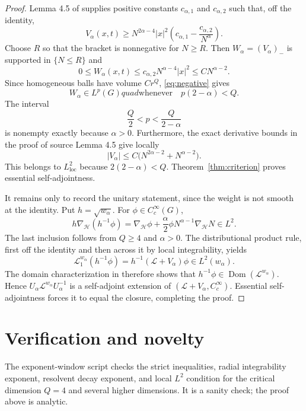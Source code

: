 \documentclass[11pt]{article}
\newcommand{\Lcal}{\mathcal L}
\newcommand{\Dom}{\operatorname{Dom}}
\begin{document}
\begin{proof}
Lemma 4.5 of \cite{BC} supplies positive constants $c_{\alpha,1}$ and
$c_{\alpha,2}$ such that, off the identity,
\begin{equation}\label{eq:source-lower}
 V_\alpha(x,t)\geq
 N^{2\alpha-4}|x|^2
 \left(c_{\alpha,1}-\frac{c_{\alpha,2}}{N^\alpha}\right).
\end{equation}
Choose $R$ so that the bracket is nonnegative for $N\geq R$.  Then
$W_\alpha=(V_\alpha)_-$ is supported in $\{N\leq R\}$ and
\begin{equation}\label{eq:negative}
 0\leq W_\alpha(x,t)
 \leq c_{\alpha,2}N^{\alpha-4}|x|^2
 \leq C N^{\alpha-2}.
\end{equation}
Since homogeneous balls have volume $Cr^Q$, \eqref{eq:negative} gives
\[
 W_\alpha\in L^p(G)quad\text{whenever}\quad p(2-\alpha)<Q.
\]
The interval
\[
 \frac Q2<p<\frac{Q}{2-\alpha}
\]
is nonempty exactly because $\alpha>0$.  Furthermore, the exact derivative
bounds in the proof of source Lemma 4.5 give locally
\[
 |V_\alpha|\leq C\bigl(N^{2\alpha-2}+N^{\alpha-2}\bigr).
\]
This belongs to $L^2_{\mathrm{loc}}$ because
$2(2-\alpha)<Q$.  Theorem~\ref{thm:criterion} proves essential
self-adjointness.

It remains only to record the unitary statement, since the weight is not
smooth at the identity.  Put $h=\sqrt{w_\alpha}$.  For
$\phi\in C_c^\infty(G)$,
\[
 h\nabla_{\mathcal H}(h^{-1}\phi)
 =\nabla_{\mathcal H}\phi
  +\frac\alpha2\phi N^{\alpha-1}\nabla_{\mathcal H}N\in L^2.
\]
The last inclusion follows from $Q\geq4$ and $\alpha>0$.  The distributional
product rule, first off the identity and then across it by local
integrability, yields
\[
 \Lcal^{w_\alpha}_1(h^{-1}\phi)
 =h^{-1}(\Lcal+V_\alpha)\phi\in L^2(w_\alpha).
\]
The domain characterization in \cite[Theorem 2.3]{BC} therefore shows that
$h^{-1}\phi\in\Dom(\Lcal^{w_\alpha})$.  Hence
$U_\alpha\Lcal^{w_\alpha}U_\alpha^{-1}$ is a self-adjoint extension of
$(\Lcal+V_\alpha,C_c^\infty)$.  Essential self-adjointness forces it to equal
the closure, completing the proof.
\end{proof}

\section{Verification and novelty}

The exponent-window script checks the strict inequalities, radial
integrability exponent, resolvent decay exponent, and local $L^2$ condition
for the critical dimension $Q=4$ and several higher dimensions.  It is a
sanity check; the proof above is analytic.
\end{document}
